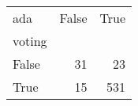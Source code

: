 \begin{tabular}{lrr}
\toprule
ada &  False &  True  \\
voting &        &        \\
\midrule
False  &     31 &     23 \\
True   &     15 &    531 \\
\bottomrule
\end{tabular}
